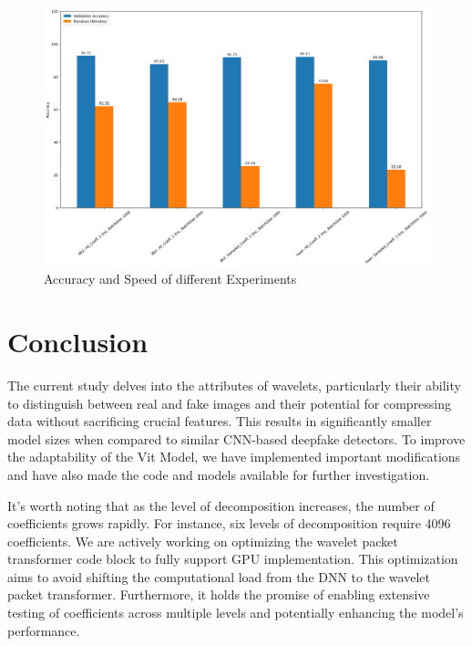 \documentclass{svproc}
\begin{document}
\begin{figure}[H]
  \centering
    \includegraphics[width=0.9\linewidth]{figures/Compare_speed.png}
    \caption{Accuracy and Speed of different Experiments }
    \label{fig:exp1_model}
\end{figure}

%
%

\section{Conclusion}
The current study delves into the attributes of wavelets, particularly their ability to distinguish between real and fake images and their potential for compressing data without sacrificing crucial features. This results in significantly smaller model sizes when compared to similar CNN-based deepfake detectors. To improve the adaptability of the Vit Model, we have implemented important modifications and have also made the code and models available for further investigation.

It's worth noting that as the level of decomposition increases, the number of coefficients grows rapidly. For instance, six levels of decomposition require 4096 coefficients. We are actively working on optimizing the wavelet packet transformer code block to fully support GPU implementation. This optimization aims to avoid shifting the computational load from the DNN to the wavelet packet transformer. Furthermore, it holds the promise of enabling extensive testing of coefficients across multiple levels and potentially enhancing the model's performance.
\end{document}
